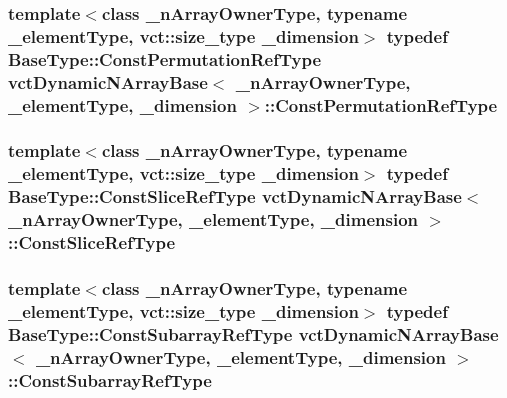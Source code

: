 \subsubsection[{Const\+Permutation\+Ref\+Type}]{\setlength{\rightskip}{0pt plus 5cm}template$<$class \+\_\+n\+Array\+Owner\+Type, typename \+\_\+element\+Type, vct\+::size\+\_\+type \+\_\+dimension$>$ typedef {\bf Base\+Type\+::\+Const\+Permutation\+Ref\+Type} {\bf vct\+Dynamic\+N\+Array\+Base}$<$ \+\_\+n\+Array\+Owner\+Type, \+\_\+element\+Type, \+\_\+dimension $>$\+::{\bf Const\+Permutation\+Ref\+Type}}\label{classvct_dynamic_n_array_base_a8e5f4edd6bbaaa0650c24f464a5c13b6}
\hypertarget{classvct_dynamic_n_array_base_ac83089be31d75a0a4c8ef603506f820f}{}
\subsubsection[{Const\+Slice\+Ref\+Type}]{\setlength{\rightskip}{0pt plus 5cm}template$<$class \+\_\+n\+Array\+Owner\+Type, typename \+\_\+element\+Type, vct\+::size\+\_\+type \+\_\+dimension$>$ typedef {\bf Base\+Type\+::\+Const\+Slice\+Ref\+Type} {\bf vct\+Dynamic\+N\+Array\+Base}$<$ \+\_\+n\+Array\+Owner\+Type, \+\_\+element\+Type, \+\_\+dimension $>$\+::{\bf Const\+Slice\+Ref\+Type}}\label{classvct_dynamic_n_array_base_ac83089be31d75a0a4c8ef603506f820f}
\hypertarget{classvct_dynamic_n_array_base_a022316a8c3f976026301c5da668d1fb4}{}
\subsubsection[{Const\+Subarray\+Ref\+Type}]{\setlength{\rightskip}{0pt plus 5cm}template$<$class \+\_\+n\+Array\+Owner\+Type, typename \+\_\+element\+Type, vct\+::size\+\_\+type \+\_\+dimension$>$ typedef {\bf Base\+Type\+::\+Const\+Subarray\+Ref\+Type} {\bf vct\+Dynamic\+N\+Array\+Base}$<$ \+\_\+n\+Array\+Owner\+Type, \+\_\+element\+Type, \+\_\+dimension $>$\+::{\bf Const\+Subarray\+Ref\+Type}}\label{classvct_dynamic_n_array_base_a022316a8c3f976026301c5da668d1fb4}
\hypertarget{classvct_dynamic_n_array_base_afe6d2a8cd86a6b3a0828249b976389ba}{}
